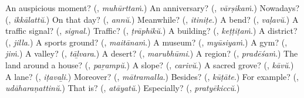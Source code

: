 \begin{tcolorbox}[breakable,colback=teal!4,colframe=teal!35!black,title={Before you move on}]
An auspicious moment? (\textbf{}, \emph{muhūrttaṁ}.) An anniversary? (\textbf{}, \emph{vārṣikaṁ}.) Nowadays? (\textbf{}, \emph{ikkālattŭ}.) On that day? (\textbf{}, \emph{annŭ}.) Meanwhile? (\textbf{}, \emph{itiniṭe}.) A bend? (\textbf{}, \emph{vaḷavŭ}.) A traffic signal? (\textbf{}, \emph{signal}.) Traffic? (\textbf{}, \emph{ṭrāphikŭ}.) A building? (\textbf{}, \emph{keṭṭiṭaṁ}.) A district? (\textbf{}, \emph{jilla}.) A sports ground? (\textbf{}, \emph{maitānaṁ}.) A museum? (\textbf{}, \emph{myūsiyaṁ}.) A gym? (\textbf{}, \emph{jiṁ}.) A valley? (\textbf{}, \emph{tāḻvara}.) A desert? (\textbf{}, \emph{marubhūmi}.) A region? (\textbf{}, \emph{pradēśaṁ}.) The land around a house? (\textbf{}, \emph{paṟampŭ}.) A slope? (\textbf{}, \emph{carivŭ}.) A sacred grove? (\textbf{}, \emph{kāvŭ}.) A lane? (\textbf{}, \emph{iṭavaḻi}.) Moreover? (\textbf{}, \emph{mātramalla}.) Besides? (\textbf{}, \emph{kūṭāte}.) For example? (\textbf{}, \emph{udāharaṇattinŭ}.) That is? (\textbf{}, \emph{atāyatŭ}.) Especially? (\textbf{}, \emph{pratyēkiccŭ}.)
\end{tcolorbox}

